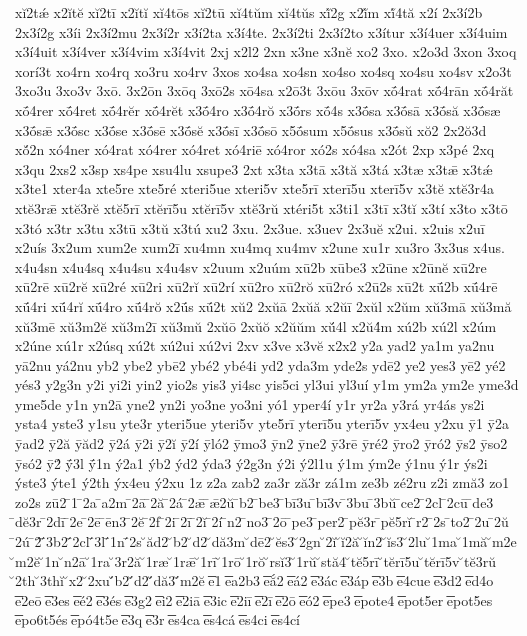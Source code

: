 {xĭ2tǽ
x2ĭtĕ
xĭ2tī
x2ĭtĭ
xĭ4tōs
xĭ2tū
xĭ4tŭm
xĭ4tŭs
xĭ́2g
x2ĭ́m
xĭ́4tă
x2í
2x3í2b
2x3í2g
x3íi
2x3í2mu
2x3í2r
x3í2ta
x3í4te.
2x3í2ti
2x3í2to
x3ítur
x3í4uer
x3í4uim
x3í4uit
x3í4ver
x3í4vim
x3í4vit
2xj
x2l2
2xn
x3ne
x3nĕ
xo2
3xo.
x2o3d
3xon
3xoq
xorí3t
xo4rn
xo4rq
xo3ru
xo4rv
3xos
xo4sa
xo4sn
xo4so
xo4sq
xo4su
xo4sv
x2o3t
3xo3u
3xo3v
3xō.
3x2ōn
3xōq
3xō2s
xō4sa
x2ō3t
3xōu
3xōv
xṓ4rat
xṓ4rān
xṓ4răt
xṓ4rer
xṓ4ret
xṓ4rĕr
xṓ4rĕt
x3ṓ4ro
x3ṓ4rŏ
x3ṓrs
xṓ4s
x3ṓsa
x3ṓsā
x3ṓsă
x3ṓsæ
x3ṓsǣ
x3ṓsc
x3ṓse
x3ṓsē
x3ṓsĕ
x3ṓsī
x3ṓsō
x5ṓsum
x5ṓsus
x3ṓsŭ
xŏ2
2x2ŏ3d
xŏ́2n
xó4ner
xó4rat
xó4rer
xó4ret
xó4riē
xó4ror
xó2s
xó4sa
x2ót
2xp
x3pé
2xq
x3qu
2xs2
x3sp
xs4pe
xsu4lu
xsupe3
2xt
x3ta
x3tā
x3tă
x3tá
x3tæ
x3tǣ
x3tǽ
x3te1
xter4a
xte5re
xte5ré
xteri5ue
xteri5v
xte5rī
xterī5u
xterī5v
x3tĕ
xtĕ3r4a
xtĕ3rǣ
xtĕ3rĕ
xtĕ5rī
xtĕrī5u
xtĕrī5v
xtĕ3rŭ
xtéri5t
x3ti1
x3tī
x3tĭ
x3tí
x3to
x3tō
x3tó
x3tr
x3tu
x3tū
x3tŭ
x3tú
xu2
3xu.
2x3ue.
x3uev
2x3uĕ
x2ui.
x2uis
x2uī
x2uís
3x2um
xum2e
xum2ī
xu4mn
xu4mq
xu4mv
x2une
xu1r
xu3ro
3x3us
x4us.
x4u4sn
x4u4sq
x4u4su
x4u4sv
x2uum
x2uúm
xū2b
xūbe3
x2ūne
x2ūnĕ
xū2re
xū2rē
xū2rĕ
xū2ré
xū2ri
xū2rĭ
xū2rí
xū2ro
xū2rŏ
xū2ró
x2ū2s
xū2t
xū́2b
xū́4rē
xū́4ri
xū́4rĭ
xū́4ro
xū́4rŏ
x2ū́s
xū́2t
xŭ2
2xŭā
2xŭă
x2ŭī
2xŭl
x2ŭm
xŭ3mā
xŭ3mă
xŭ3mē
xŭ3m2ĕ
xŭ3m2ī
xŭ3mŭ
2xŭō
2xŭŏ
x2ŭŭm
xŭ́4l
x2ŭ4́m
xú2b
xú2l
x2úm
x2úne
xú1r
x2úsq
xú2t
xú2ui
xú2vi
2xv
x3ve
x3vĕ
x2x2
y2a
yad2
ya1m
ya2nu
yā2nu
yá2nu
yb2
ybe2
ybē2
ybé2
ybé4i
yd2
yda3m
yde2s
ydē2
ye2
yes3
yē2
yé2
yés3
y2g3n
y2i
yi2i
yin2
yio2s
yis3
yi4sc
yis5ci
yl3ui
yl3uí
y1m
ym2a
ym2e
yme3d
yme5de
y1n
yn2ā
yne2
yn2i
yo3ne
yo3ni
yó1
yper4í
y1r
yr2a
y3rá
yr4ás
ys2i
ysta4
yste3
y1su
yte3r
yteri5ue
yteri5v
yte5rī
yterī5u
yterī5v
yx4eu
y2xu
ȳ1
ȳ2a
ȳad2
ȳ2ă
ȳăd2
ȳ2á
ȳ2i
ȳ2ĭ
ȳ2í
ȳló2
ȳmo3
ȳn2
ȳne2
ȳ3rē
ȳré2
ȳro2
ȳró2
ȳs2
ȳso2
ȳsó2
ȳ2́
ȳ́3l
ȳ́1n
ý2a1
ýb2
ýd2
ýda3
ý2g3n
ý2i
ý2l1u
ý1m
ým2e
ý1nu
ý1r
ýs2i
ýste3
ýte1
ý2th
ýx4eu
ý2xu
1z
z2a
zab2
za3r
ză3r
zá1m
ze3b
zé2ru
z2i
zmă3
zo1
zo2s
zū2
̄1
̄2a
̄a2m
̄2ā
̄2ă
̄2á
̄2ǣ
̄ǣ2ŭ
̄b2
̄be3
̄bī3u
̄bī3v
̄3bu
̄3bŭ
̄ce2
̄2cl
̄2cū
̄de3
̄dĕ3r
̄2dī
̄2e
̄2ē
̄ēn3
̄2ĕ
̄2f
̄2i
̄2ī
̄2ĭ
̄2í
̄n2
̄no3
̄2ō
̄pe3
̄per2
̄pĕ3r
̄pĕ5rĭ
̄r2
̄2s
̄to2
̄2u
̄2ŭ
̄2ú
̄2́
̄́3b2
̄́2cl
̄́3l
̄́1n
̄́2s
̆ăd2
̆b2
̆d2
̆dă3m
̆dē2
̆ĕs3
̆2gn
̆2ĭ
̆ĭ2ă
̆ĭn2
̆ĭs3
̆2lu
̆1ma
̆1mă
̆m2e
̆m2ĕ
̆1n
̆n2ā
̆1ra
̆3r2ă
̆1ræ
̆1rǣ
̆1rī
̆1rō
̆1rŏ
̆rsĭ3
̆1rŭ
̆stă4
̆tĕ5rī
̆tĕrī5u
̆tĕrī5v
̆tĕ3rŭ
̆2th
̆3thĭ
̆x2
̆2xu
̆́b2
̆́d2
̆́dă3
̆́m2ĕ
͞e1
͞ea2b3
͞eắ2
͞eá2
͞e3ác
͞e3áp
͞e3b
͞e4cue
͞e3d2
͞ed4o
͞e2eō
͞e3es
͞eé2
͞e3és
͞e3g2
͞ei2
͞e2iā
͞e3ic
͞e2iī
͞e2ī
͞e2ō
͞eó2
͞epe3
͞epote4
͞epot5er
͞epot5es
͞epo6t5és
͞epó4t5e
͞e3q
͞e3r
͞es4ca
͞es4cá
͞es4ci
͞es4cí
}
